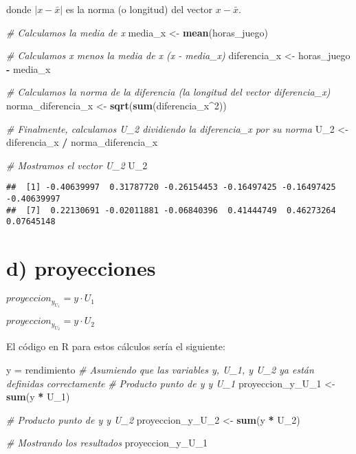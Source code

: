 \documentclass[
]{article}
\newenvironment{Shaded}{\begin{snugshade}}{\end{snugshade}}
\newcommand{\CommentTok}[1]{\textcolor[rgb]{0.56,0.35,0.01}{\textit{#1}}}
\newcommand{\DecValTok}[1]{\textcolor[rgb]{0.00,0.00,0.81}{#1}}
\newcommand{\FunctionTok}[1]{\textcolor[rgb]{0.13,0.29,0.53}{\textbf{#1}}}
\newcommand{\NormalTok}[1]{#1}
\newcommand{\OtherTok}[1]{\textcolor[rgb]{0.56,0.35,0.01}{#1}}
\newcommand{\SpecialCharTok}[1]{\textcolor[rgb]{0.81,0.36,0.00}{\textbf{#1}}}
\begin{document}
donde \(|x - \bar{x}|\) es la norma (o longitud) del vector
\(x - \bar{x}\).

\begin{Shaded}
\begin{Highlighting}[]
\CommentTok{\# Calculamos la media de x}
\NormalTok{media\_x }\OtherTok{\textless{}{-}} \FunctionTok{mean}\NormalTok{(horas\_juego)}

\CommentTok{\# Calculamos x menos la media de x (x {-} media\_x)}
\NormalTok{diferencia\_x }\OtherTok{\textless{}{-}}\NormalTok{ horas\_juego }\SpecialCharTok{{-}}\NormalTok{ media\_x}

\CommentTok{\# Calculamos la norma de la diferencia (la longitud del vector diferencia\_x)}
\NormalTok{norma\_diferencia\_x }\OtherTok{\textless{}{-}} \FunctionTok{sqrt}\NormalTok{(}\FunctionTok{sum}\NormalTok{(diferencia\_x}\SpecialCharTok{\^{}}\DecValTok{2}\NormalTok{))}

\CommentTok{\# Finalmente, calculamos U\_2 dividiendo la diferencia\_x por su norma}
\NormalTok{U\_2 }\OtherTok{\textless{}{-}}\NormalTok{ diferencia\_x }\SpecialCharTok{/}\NormalTok{ norma\_diferencia\_x}

\CommentTok{\# Mostramos el vector U\_2}
\NormalTok{U\_2}
\end{Highlighting}
\end{Shaded}

\begin{verbatim}
##  [1] -0.40639997  0.31787720 -0.26154453 -0.16497425 -0.16497425 -0.40639997
##  [7]  0.22130691 -0.02011881 -0.06840396  0.41444749  0.46273264  0.07645148
\end{verbatim}

\hypertarget{d-proyecciones}{%
\section{d) proyecciones}\label{d-proyecciones}}

\(proyeccion_y_{U_1} = y \cdot U_1\)

\(proyeccion_y_{U_2} = y \cdot U_2\)

El código en R para estos cálculos sería el siguiente:

\begin{Shaded}
\begin{Highlighting}[]
\NormalTok{y }\OtherTok{=}\NormalTok{ rendimiento}
\CommentTok{\# Asumiendo que las variables y, U\_1, y U\_2 ya están definidas correctamente}
\CommentTok{\# Producto punto de y y U\_1}
\NormalTok{proyeccion\_y\_U\_1 }\OtherTok{\textless{}{-}} \FunctionTok{sum}\NormalTok{(y }\SpecialCharTok{*}\NormalTok{ U\_1)}

\CommentTok{\# Producto punto de y y U\_2}
\NormalTok{proyeccion\_y\_U\_2 }\OtherTok{\textless{}{-}} \FunctionTok{sum}\NormalTok{(y }\SpecialCharTok{*}\NormalTok{ U\_2)}

\CommentTok{\# Mostrando los resultados}
\NormalTok{proyeccion\_y\_U\_1}
\end{Highlighting}
\end{Shaded}
\end{document}
